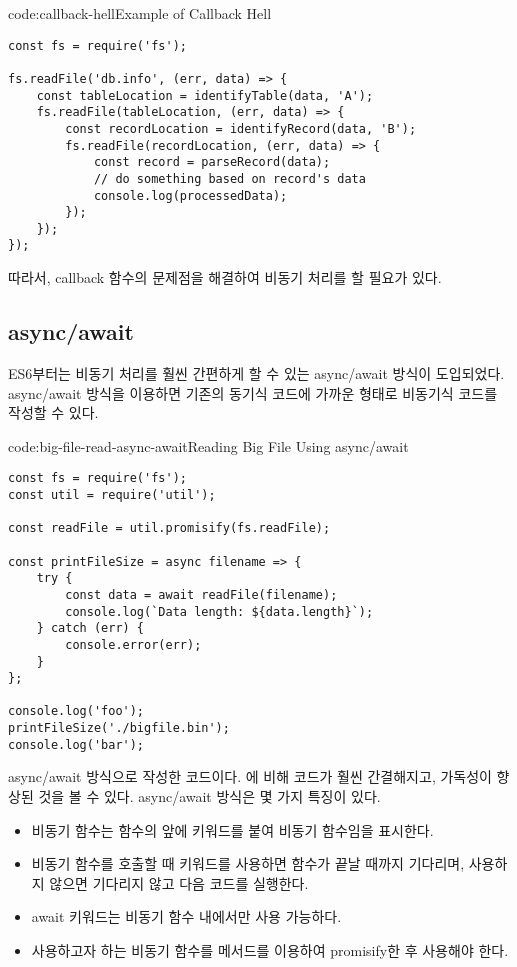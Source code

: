 \begin{codeenv}{code:callback-hell}{Example of Callback Hell}\begin{verbatim}
const fs = require('fs');

fs.readFile('db.info', (err, data) => {
    const tableLocation = identifyTable(data, 'A');
    fs.readFile(tableLocation, (err, data) => {
        const recordLocation = identifyRecord(data, 'B');
        fs.readFile(recordLocation, (err, data) => {
            const record = parseRecord(data);
            // do something based on record's data
            console.log(processedData);
        });
    });
});
\end{verbatim}
\end{codeenv}

따라서, callback 함수의 문제점을 해결하여 비동기 처리를 할 필요가 있다.

\subsection*{async/await}

ES6부터는 비동기 처리를 훨씬 간편하게 할 수 있는 async/await 방식이 도입되었다. async/await 방식을 이용하면 기존의 동기식 코드에 가까운 형태로 비동기식 코드를 작성할 수 있다.

\begin{codeenv}{code:big-file-read-async-await}{Reading Big File Using async/await}\begin{verbatim}
const fs = require('fs');
const util = require('util');

const readFile = util.promisify(fs.readFile);

const printFileSize = async filename => {
    try {
        const data = await readFile(filename);
        console.log(`Data length: ${data.length}`);
    } catch (err) {
        console.error(err);
    }
};

console.log('foo');
printFileSize('./bigfile.bin');
console.log('bar');
\end{verbatim}
\end{codeenv}

\은 \를 async/await 방식으로 작성한 코드이다. 에 비해 코드가 훨씬 간결해지고, 가독성이 향상된 것을 볼 수 있다. async/await 방식은 몇 가지 특징이 있다.

\begin{itemize}
    \item 비동기 함수는 함수의 앞에  키워드를 붙여 비동기 함수임을 표시한다.
    \item 비동기 함수를 호출할 때  키워드를 사용하면 함수가 끝날 때까지 기다리며, 사용하지 않으면 기다리지 않고 다음 코드를 실행한다.
    \item await 키워드는 비동기 함수 내에서만 사용 가능하다.
    \item 사용하고자 하는 비동기 함수를  메서드를 이용하여 promisify한 후 사용해야 한다.
\end{itemize}

